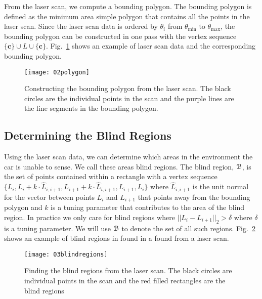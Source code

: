 From the laser scan, we compute a bounding polygon. The bounding
polygon is defined as the minimum area simple polygon that contains all the
points in the laser scan. Since the laser scan data is ordered by $\theta_i$
from $\theta_{\min}$ to $\theta_{\max}$, the bounding polygon can be
constructed in one pass with the vertex sequence $\{\mathbf{c}\} \cup L \cup
\{\mathbf{c}\}$. Fig.~\ref{fig:polygon} shows an example of laser scan
data and the corresponding bounding polygon.

\begin{figure}[ht]

    \centering
    \texttt{[image: 02polygon]}

    \caption{Constructing the bounding polygon from the laser scan. The black
        circles are the individual points in the scan and the purple lines
        are the line segments in the bounding polygon.}

    \label{fig:polygon}
\end{figure}

\subsection{Determining the Blind Regions}

\label{sec:blindregions}

Using the laser scan data, we can determine which areas in the environment the
car is unable to sense. We call these areas blind regions. The blind region,
${{\mathcal{B}}}$, is the set of points contained within a rectangle with a vertex sequence
$\{L_i, L_i + k \cdot \hat{L}_{i, i + 1}, L_{i + 1} + k \cdot \hat{L}_{i, i +
1}, L_{i + 1}, L_i\}$ where $\hat{L}_{i, i + 1}$ is the unit normal for the
vector between points $L_i$ and $L_{i + 1}$ that points away from the bounding
polygon and $k$ is a tuning parameter that contributes to the area of the blind
region. In practice we only care for blind regions where $||L_i - L_{i + 1}||_2
> \delta$ where $\delta$ is a tuning parameter. We will use ${{\mathcal{B}}}$ to denote the
set of all such regions.  Fig.~\ref{fig:blindregions} shows an example of blind
regions in found in a found from a laser scan.

\begin{figure}[ht]

    \centering
    \texttt{[image: 03blindregions]}

    \caption{Finding the blind regions from the laser scan. The black circles
        are individual points in the scan and the red filled rectangles are the
        blind regions}

    \label{fig:blindregions}
\end{figure}

